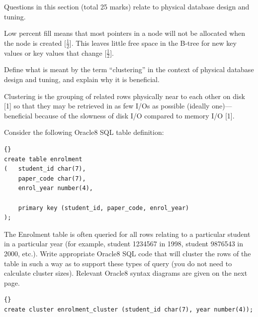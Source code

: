 \documentclass[markingschedule]{ouexam}
\begin{document}
\begin{examsection}{25}{}{Questions in this section (total 25 marks) relate to
physical database design and tuning.}
\begin{question}{10}
\begin{subquestion}{4}
\begin{subsubquestion}{2}
\begin{marking}
				Low percent fill means that most pointers in a node will not be
				allocated when the node is created [$\frac{1}{2}$]. This leaves
				little free space in the B-tree for new key values or key
				values that change [$\frac{1}{2}$].
			\end{marking}
		\end{subsubquestion}
	\end{subquestion}
	

\end{question}
	

\begin{question}{5}\label{clusterq}


	\begin{subquestion}{2}
		Define what is meant by the term ``clustering'' in the context of
		physical database design and tuning, and explain why it is beneficial.
		\begin{marking}
			Clustering is the grouping of related rows physically near to each
			other on disk [1] so that they may be retrieved in as few I/Os as
			possible (ideally one)---beneficial because of the slowness of disk
			I/O compared to memory I/O [1].
		\end{marking}
	\end{subquestion}
	

	\begin{subquestion}{3}\label{clusterqcode}
		Consider the following Oracle8 SQL table definition:
		
		\begin{lstlisting}[language={[Oracle8]SQL}]{}
create table enrolment
(	student_id char(7),
	paper_code char(7),
	enrol_year number(4),
  
	primary key (student_id, paper_code, enrol_year)
);
		\end{lstlisting}

		The \textsf{Enrolment} table is often queried for all rows relating to
		a particular student in a particular year (for example, student 1234567
		in 1998, student 9876543 in 2000, etc.). Write appropriate Oracle8 SQL
		code that will cluster the rows of the table in such a way as to
		support these types of query (you do not need to calculate cluster
		sizes). Relevant Oracle8 syntax diagrams are given on the next page.
		\begin{marking}
			\begin{lstlisting}[language={[Oracle8]SQL}]{}
create cluster enrolment_cluster (student_id char(7), year number(4));


\end{lstlisting}
\end{marking}
\end{subquestion}
\end{question}
\end{examsection}
\end{document}
